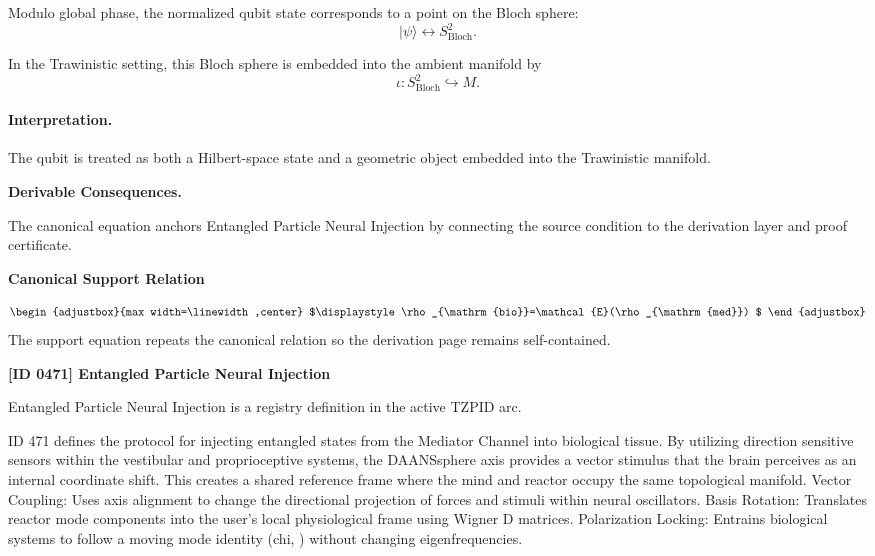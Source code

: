Modulo global phase, the normalized qubit state corresponds to a point on the Bloch sphere:
\begin{equation}
|\psi\rangle \longleftrightarrow S^2_{\mathrm{Bloch}} .
\end{equation}

In the Trawinistic setting, this Bloch sphere is embedded into the ambient manifold by
\begin{equation}
\boxed{
\iota:S^2_{\mathrm{Bloch}}\hookrightarrow M .
}
\end{equation}

\paragraph{Interpretation.}
The qubit is treated as both a Hilbert-space state and a geometric object embedded into the Trawinistic manifold.

\par\vspace{0.35em}
\noindent\textbf{Derivable Consequences.}\quad
\begingroup
\footnotesize
\raggedright
The canonical equation anchors Entangled Particle Neural Injection by connecting the source condition to the derivation layer and proof certificate.
\par\endgroup

\noindent\textbf{Canonical Support Relation}\par
\[
\begin{adjustbox}{max width=\linewidth,center}
$\displaystyle
\rho_{\mathrm{bio}}=\mathcal{E}(\rho_{\mathrm{med}})
$
\end{adjustbox}
\]
\noindent The support equation repeats the canonical relation so the derivation page remains self-contained.\par

\clearpage
\noindent\textbf{[ID 0471] Entangled Particle Neural Injection}\par
\vspace{0.35em}
\begingroup\small
{}
Entangled Particle Neural Injection is a registry definition in the active TZPID arc.

ID 471 defines the protocol for injecting entangled states from the Mediator Channel into biological tissue. By utilizing direction sensitive sensors within the vestibular and proprioceptive systems, the DAANSsphere axis provides a vector stimulus that the brain perceives as an internal coordinate shift. This creates a shared reference frame where the mind and reactor occupy the same topological manifold. Vector Coupling: Uses axis alignment to change the directional projection of forces and stimuli within neural oscillators. Basis Rotation: Translates reactor mode components into the user's local physiological frame using Wigner D matrices. Polarization Locking: Entrains biological systems to follow a moving mode identity (chi, ) without changing eigenfrequencies.


